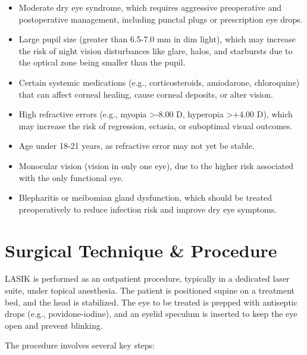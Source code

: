 \begin{itemize}
  \item Moderate dry eye syndrome, which requires aggressive preoperative and postoperative management, including punctal plugs or prescription eye drops.
  
  \item Large pupil size (greater than 6.5-7.0 mm in dim light), which may increase the risk of night vision disturbances like glare, halos, and starbursts due to the optical zone being smaller than the pupil.
  
  \item Certain systemic medications (e.g., corticosteroids, amiodarone, chloroquine) that can affect corneal healing, cause corneal deposits, or alter vision.
  
  \item High refractive errors (e.g., myopia >-8.00 D, hyperopia >+4.00 D), which may increase the risk of regression, ectasia, or suboptimal visual outcomes.
  
  \item Age under 18-21 years, as refractive error may not yet be stable.
  
  \item Monocular vision (vision in only one eye), due to the higher risk associated with the only functional eye.
  
  \item Blepharitis or meibomian gland dysfunction, which should be treated preoperatively to reduce infection risk and improve dry eye symptoms.
\end{itemize}

\section*{Surgical Technique \& Procedure}
LASIK is performed as an outpatient procedure, typically in a dedicated laser suite, under topical anesthesia. The patient is positioned supine on a treatment bed, and the head is stabilized. The eye to be treated is prepped with antiseptic drops (e.g., povidone-iodine), and an eyelid speculum is inserted to keep the eye open and prevent blinking.

The procedure involves several key steps:

